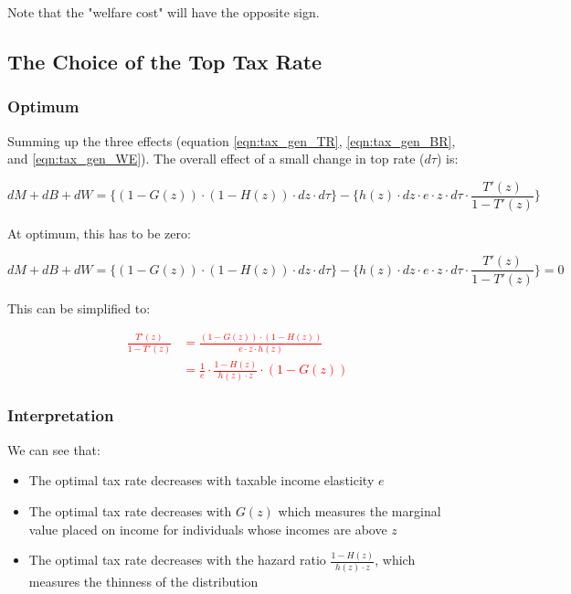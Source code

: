             Note that the "welfare cost" will have the opposite sign.

    \subsection{The Choice of the Top Tax Rate}
    
        \subsubsection{Optimum}

            Summing up the three effects (equation \ref{eqn:tax_gen_TR}, \ref{eqn:tax_gen_BR}, and \ref{eqn:tax_gen_WE}). The overall effect of a small change in top rate ($d\tau$) is:
    
            \begin{equation*}
                dM + dB + dW = \Big\{ (1-G(z)) \cdot (1-H(z)) \cdot dz \cdot d\tau \Big\} - \Big\{ h(z) \cdot dz \cdot e \cdot z \cdot d\tau \cdot \frac{T'(z)}{1-T'(z)} \Big\}
            \end{equation*}
    
            At optimum, this has to be zero:
    
            \begin{equation*}
                dM + dB + dW = \Big\{ (1-G(z)) \cdot (1-H(z)) \cdot dz \cdot d\tau \Big\} - \Big\{ h(z) \cdot dz \cdot e \cdot z \cdot d\tau \cdot \frac{T'(z)}{1-T'(z)} \Big\} = 0
            \end{equation*}
    
            This can be simplified to:
    
            \textcolor{red}{\begin{align}
                \frac{T'(z)}{1-T'(z)} &= \frac{(1-G(z)) \cdot (1-H(z))}{e \cdot z \cdot h(z)} \\
                &= \frac{1}{e} \cdot \frac{1-H(z)}{h(z) \cdot z} \cdot (1-G(z))
            \end{align}}

        \subsubsection{Interpretation}

            We can see that:
            \begin{itemize}
                \item The optimal tax rate decreases with taxable income elasticity $e$
                \item The optimal tax rate decreases with $G(z)$ which measures the marginal value placed on income for individuals whose incomes are above $z$
                \item The optimal tax rate decreases with the hazard ratio $\frac{1-H(z)}{h(z) \cdot z}$, which measures the thinness of the distribution
            \end{itemize}

